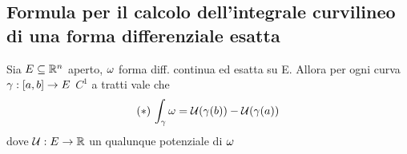 \subsection{Formula per il calcolo dell’integrale curvilineo di una forma differenziale esatta}
\begin{theorem}
  Sia $E \subseteq \mathbb{R}^n$ aperto, $\omega$ forma diff. continua ed esatta su E. Allora per ogni
  curva $\gamma:[a,b]\to E$ $C^1$ a tratti vale che 
  $$(*)\, \int_{\gamma}\omega = \mathcal{U}(\gamma(b))-\mathcal{U}(\gamma(a))$$
  dove $\mathcal{U}:E\to\mathbb{R}$ \ace un qualunque potenziale di $\omega$
\end{theorem}